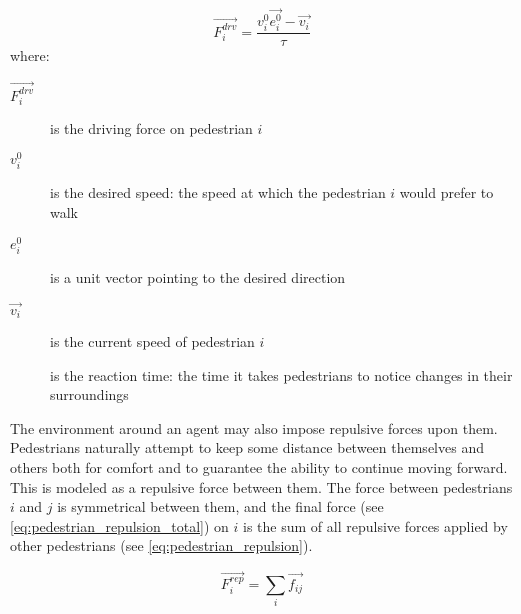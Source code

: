 \documentclass[twoside, 11pt]{article}
\begin{document}
\begin{equation}
  \vec{F_i^{drv}} = \frac{v_i^0 \vec{e_i^0} - \vec{v_i}}{\tau}
  \label{eq:driving_force}
\end{equation}
where:
\begin{description}
  \item[$\vec{F_i^{drv}}$] is the driving force on pedestrian $i$
  \item[$v_i^0$] is the desired speed: the speed at which the pedestrian $i$ would prefer to walk
  \item[$e_i^0$] is a unit vector pointing to the desired direction
  \item[$\vec{v_i}$] is the current speed of pedestrian $i$
  \item[\tau] is the reaction time: the time it takes pedestrians to notice changes in their surroundings 
\end{description}

The environment around an agent may also impose repulsive forces upon them. Pedestrians naturally attempt to keep some distance between themselves and others both for comfort and to guarantee the ability to continue moving forward. This is modeled as a repulsive force between them. The force between pedestrians $i$ and $j$ is symmetrical between them, and the final force (see \autoref{eq:pedestrian_repulsion_total}) on $i$ is the sum of all repulsive forces applied by other pedestrians (see \autoref{eq:pedestrian_repulsion}).

\begin{equation}
  \vec{F_i^{rep}} = \sum_i\vec{f_{ij}}
  \label{eq:pedestrian_repulsion_total}
\end{equation}
\end{document}
